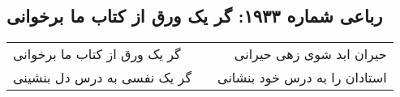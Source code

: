 \begin{center}
\section*{رباعی شماره ۱۹۳۳: گر یک ورق از کتاب ما برخوانی}
\label{sec:1933}
\begin{longtable}{l p{0.5cm} r}
گر یک ورق از کتاب ما برخوانی
&&
حیران ابد شوی زهی حیرانی
\\
گر یک نفسی به درس دل بنشینی
&&
استادان را به درس خود بنشانی
\\
\end{longtable}
\end{center}
